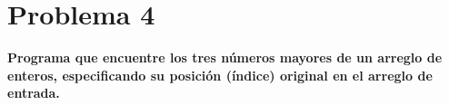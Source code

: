 \section*{Problema 4}

\textbf{Programa que encuentre los tres números mayores de un arreglo de enteros, especificando su posición (índice) original en el arreglo de entrada.}